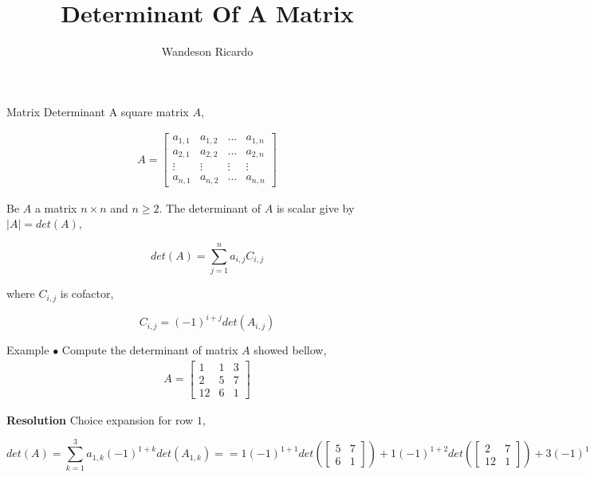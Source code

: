 \documentclass[12pt]{beamer}
\title{Determinant Of A Matrix}
\author{Wandeson Ricardo}
\begin{document}
	\maketitle
	
	\begin{frame}{Matrix Determinant}
		A square matrix $A$,
		
		\begin{align}
			A = \begin{bmatrix}
				a_{1,1} & a_{1,2} & ... & a_{1,n} \\
				a_{2,1} & a_{2,2} & ... & a_{2,n} \\
				\vdots & \vdots & \vdots & \vdots \\
				a_{n,1} & a_{n,2} & \ldots & a_{n,n} 
			\end{bmatrix}
		\end{align}

		\begin{definition}
			Be $A$ a matrix $n \times n$ and $ n \geqslant 2 $. The determinant of $A$ is scalar give by $|A| = det(A)$, 
			
			$$ det(A) = \sum_{j=1}^{n} a_{i,j} C_{i,j}$$

			where $C_{i,j}$ is cofactor,

			$$ C_{i,j} = (-1)^{i+j} det( A_{i,j} )$$			
		\end{definition}
	\end{frame}

	\begin{frame}{Example}
		$\bullet$ Compute the determinant of matrix $A$ showed bellow,
		\begin{align*}
			A =
			\begin{bmatrix}
				1 & 1 & 3 \\
				2 & 5 & 7 \\
				12 & 6 & 1
			\end{bmatrix}
		\end{align*}
	
		\textbf{ Resolution} 
		Choice expansion for row $1$,
		
		\begin{equation*}
			det(A) = \sum_{k=1}^{3} a_{1,k} (-1)^{1+k} det\left( A_{1,k} \right) = 

			= 1 (-1)^{1+1 }det \left(
			 \begin{bmatrix}
				5 & 7 \\
				6 & 1	
			\end{bmatrix} \right)  + 1 (-1)^{1+2} det \left(
			\begin{bmatrix}
				2 & 7 \\
				12 & 1
			\end{bmatrix} \right) + 
			3 (-1)^{1+3} det \left( 
			\begin{bmatrix}
				2 & 5 \\
				12 & 6
			\end{bmatrix}
			\right) = 
			
			=  1 \cdot ( 5 \cdot 1 - 7 \cdot 6 )  + (-1)( 2 \cdot 1 - 7 \cdot 12 ) + 3 \cdot 1 \cdot (2 \cdot 6 - 5 \cdot 12 ) = 
			
			= -37 + 82  - 144 = \boxed{-99} 
			
		\end{equation*}

	\end{frame}
\end{document}
